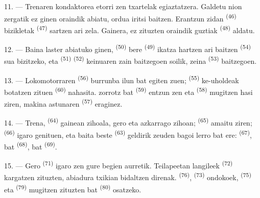 11. --- Trenaren kondaktorea etorri zen txartelak egiaztatzera. Galdetu nion
zergatik ez ginen oraindik abiatu, ordua iritsi baitzen. Erantzun zidan
 \textsuperscript{(46)} bizikletak 
\textsuperscript{(47)} sartzen ari zela. Gainera, ez zituzten oraindik
 guztiak \textsuperscript{(48)} aldatu.

12. --- Baina laster abiatuko ginen, 
\textsuperscript{(50)} bere  \textsuperscript{(49)} ikatza
hartzen ari baitzen  \textsuperscript{(54)} sua
bizitzeko, eta  \textsuperscript{(51)}
 \textsuperscript{(52)} keinuaren zain
baitzegoen soilik, zeina  \textsuperscript{(53)} baitzegoen.

13. --- Lokomotorraren  \textsuperscript{(56)} burrunba ilun bat
egiten zuen;  \textsuperscript{(55)} ke-uholdeak botatzen
zituen  \textsuperscript{(60)} nahasita. 
zorrotz bat \textsuperscript{(59)} entzun zen eta 
\textsuperscript{(58)} mugitzen hasi ziren, makina astunaren 
\textsuperscript{(57)} eraginez.

\VUsaut{3.0mm}
\VUsaut{3.0mm}

14. --- Trena,  \textsuperscript{(64)} gainean zihoala, gero eta
azkarrago zihoan;  \textsuperscript{(65)} amaitu ziren;
 \textsuperscript{(66)} igaro genituen, eta baita beste
 \textsuperscript{(63)} geldirik zeuden bagoi lerro bat ere:
 \textsuperscript{(67)},  bat
\textsuperscript{(68)},  bat \textsuperscript{(69)}.


15. --- Gero  \textsuperscript{(71)} igaro zen gure
begien aurretik. Teilapeetan langileek 
\textsuperscript{(72)} kargatzen zituzten, abiadura txikian bidaltzen direnak.
\textsuperscript{(76)},  \textsuperscript{(73)}
ondokoek,  \textsuperscript{(75)} eta
 \textsuperscript{(79)} mugitzen zituzten
 bat \textsuperscript{(80)} osatzeko.

